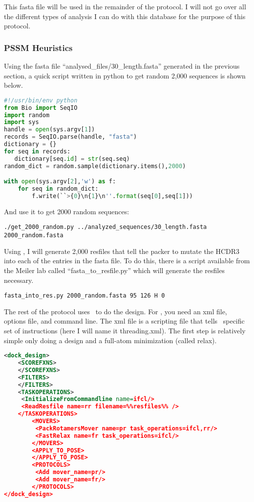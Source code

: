 This fasta file will be used in the remainder of the protocol. I will not go over all the different types of analysis I can do with this database for the purpose of this protocol.

\subsubsection{PSSM Heuristics}

Using the fasta file ``analysed\_files/30\_length.fasta'' generated in the previous section, a quick script written in python to get random 2,000 sequences is shown below.

\begin{lstlisting}[breaklines=true, language=python]
#!/usr/bin/env python
from Bio import SeqIO
import random
import sys
handle = open(sys.argv[1])
records = SeqIO.parse(handle, "fasta")
dictionary = {}
for seq in records:
   dictionary[seq.id] = str(seq.seq)
random_dict = random.sample(dictionary.items(),2000)

with open(sys.argv[2],'w') as f:
    for seq in random_dict:
        f.write(``>{0}\n{1}\n''.format(seq[0],seq[1]))
\end{lstlisting}

And use it to get 2000 random sequences:\\

\begin{lstlisting}[breaklines=true]
./get_2000_random.py ../analyzed_sequences/30_length.fasta 2000_random.fasta
\end{lstlisting}

Using \rosettadesign, I will generate 2,000 resfiles that tell the packer to mutate the HCDR3 into each of the entries in the fasta file. To do this, there is a script available from the Meiler lab called ``fasta\_to\_resfile.py'' which will generate the resfiles necessary.

\begin{lstlisting}[breaklines=true]
fasta_into_res.py 2000_random.fasta 95 126 H 0
\end{lstlisting}

The rest of the protocol uses \scripts~to do the design. For \scripts, you need an xml file, options file, and command line. The xml file is a scripting file that tells \rosetta~specific set of instructions (here I will name it threading.xml). The first step is relatively simple only doing a design and a full-atom minimization (called relax).

\begin{lstlisting}[breaklines=true, language=xml]
<dock_design>
    <SCOREFXNS>
    </SCOREFXNS>
    <FILTERS>
    </FILTERS>
    <TASKOPERATIONS>
     <InitializeFromCommandline name=ifcl/>
     <ReadResfile name=rr filename=%%resfiles%% />
    </TASKOPERATIONS>
        <MOVERS>
         <PackRotamersMover name=pr task_operations=ifcl,rr/>
         <FastRelax name=fr task_operations=ifcl/>
        </MOVERS>
        <APPLY_TO_POSE>
        </APPLY_TO_POSE>
        <PROTOCOLS>
         <Add mover_name=pr/>
         <Add mover_name=fr/>
        </PROTOCOLS>
</dock_design>
\end{lstlisting}

